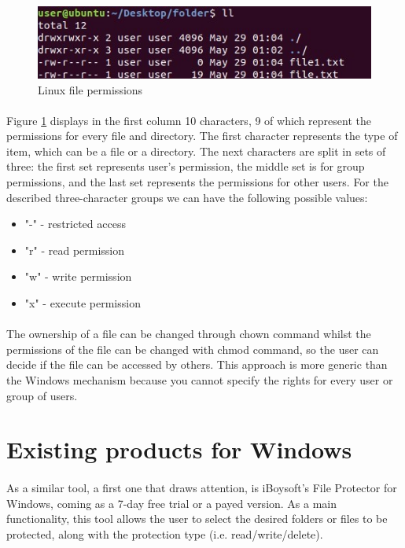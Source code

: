 	\begin{figure}[h!]
		\includegraphics[width=\linewidth]{images/linuxFilePermissions.jpg}
		\caption{Linux file permissions}
		\label{fig:linuxFilePermissions}
	\end{figure}
	
	\paragraph{}
	Figure \ref{fig:linuxFilePermissions} displays in the first column 10 characters, 9 of which represent the permissions for every file and directory. The first character represents the type of item, which can be a file or a directory. The next characters are split in sets of three: the first set represents user's permission, the middle set is for group permissions, and the last set represents the permissions for other users. For the described three-character groups we can have the following possible values:
	\begin{itemize}
		\item "-" - restricted access
		\item "r" - read permission
		\item "w" - write permission
		\item "x" - execute permission
	\end{itemize}
	
	\paragraph{}
	The ownership of a file can be changed through chown command whilst the permissions of the file can be changed with chmod command, so the user can decide if the file can be accessed by others. This approach is more generic than the Windows mechanism because you cannot specify the rights for every user or group of users.
	
		
	\section{Existing products for Windows}
	\paragraph{}
	As a similar tool, a first one that draws attention, is iBoysoft's File Protector for Windows, coming as a 7-day free trial or a payed version. As a main functionality, this tool allows the user to select the desired folders or files to be protected, along with the protection type (i.e. read/write/delete).
	
